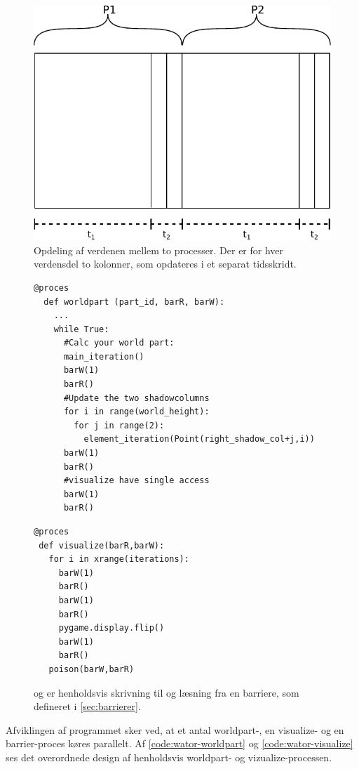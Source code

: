 \begin{figure} 
 \begin{center}
  \includegraphics[scale=0.75]{images/wator}
  \caption{Opdeling af verdenen mellem to processer. Der er for hver verdensdel 
  to kolonner, som opdateres i et separat tidsskridt.}
  \label{fig:wator}
  \end{center}
\end{figure}


\begin{figure}[hbtp] 
\begin{minipage}{\linewidth}
\begin{lstlisting}[label=code:wator-worldpart,caption=Uddrag af processen 
  \code{worldpart} i Wator]
  @proces
  def worldpart (part_id, barR, barW):  
    ...  
    while True:
      #Calc your world part:
      main_iteration()
      barW(1)
      barR()
      #Update the two shadowcolumns
      for i in range(world_height):
        for j in range(2):
          element_iteration(Point(right_shadow_col+j,i))
      barW(1)
      barR()
      #visualize have single access
      barW(1)
      barR()
\end{lstlisting}

\begin{lstlisting}[label=code:wator-visualize,caption=Processen 
  \emph{visualize} i Wator]
@proces
 def visualize(barR,barW):
   for i in xrange(iterations):
     barW(1)
     barR()
     barW(1)
     barR()
     pygame.display.flip()
     barW(1)
     barR()
   poison(barW,barR)
\end{lstlisting}

\end{minipage}
\caption[test]{ og  er henholdsvis skrivning til og læsning fra en barriere, som defineret i \cref{sec:barrierer}.}
\end{figure}
Afviklingen af programmet sker ved, at et antal worldpart-, en 
visualize- og en barrier-proces køres parallelt. Af 
\autoref{code:wator-worldpart} og \cref{code:wator-visualize} ses det 
overordnede design af henholdsvis worldpart- og 
vizualize-processen.  
